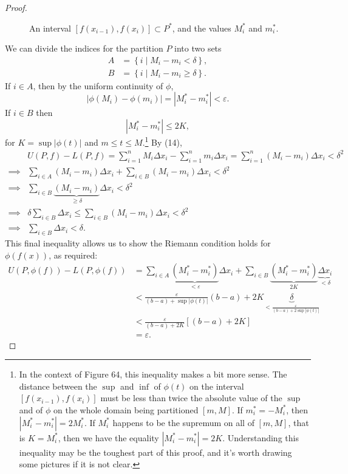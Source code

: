 \documentclass{article}
\theoremstyle{definition}
\begin{document}
\begin{proof}
\begin{figure}[h!]
			\caption{An interval $ [f(x_{i-1}),f(x_{i})]\subset P^* $, and the values $ M_i^* $  and $ m_i^* $.}
		\end{figure}
		We can divide the indices for the partition $ P $ into two sets \begin{align*}
			A&=\left\{i\mid M_i-m_i<\delta \right\},\\
			B&=\left\{i\mid M_i-m_i\ge\delta \right\}.
		\end{align*} 
		If $ i\in A $, then by the uniform continuity of $ \phi $, $$|\phi(M_i)-\phi(m_i)|=|M_i^*-m_i^*|<\varepsilon .$$ If $ i\in B $ then $$|M_i^*-m_i^*|\le 2K ,$$ for $ K=\sup|\phi(t)| $ and $ m\le t\le M $.\footnote{In the context of Figure 64, this inequality makes a bit more sense. The distance between the $ \sup $ and $ \inf $ of $ \phi(t) $ on the interval $ [f(x_{i-1}),f(x_{i})] $ must be less than twice the absolute value of the $ \sup $ and of $ \phi $ on the whole domain being partitioned $ [m,M] $. If $ m_i^*=-M_i^* $, then $ |M_i^*-m_i^*|=2M_i^* $. If $ M_i^* $ happens to be the supremum on all of $ [m,M] $, that is $ K=M_i^* $, then we have the equality $ |M_i^*-m_i^*|=2K $. Understanding this inequality may be the toughest part of this proof, and it's worth drawing some pictures if it is not clear.} 	By (14), \begin{align*}
			&U(P,f)-L(P,f)=\sum_{i=1}^nM_i\Delta x_i-\sum_{i=1}^nm_i\Delta x_i=\sum_{i=1}^n(M_i-m_i)\Delta x_i<\delta^2\\\implies&\sum_{i\in A}(M_i-m_i)\Delta x_i+\sum_{i\in B}(M_i-m_i)\Delta x_i<\delta^2\\\implies&\sum_{i\in B}\underbrace{(M_i-m_i)}_{\ge\delta}\Delta x_i<\delta^2\\\implies& \delta \sum_{i\in B}\Delta x_i\le\sum_{i\in B}(M_i-m_i)\Delta x_i<\delta^2\\\implies& \sum_{i\in B}\Delta x_i<\delta.
		\end{align*}
		This final inequality allows us to show the Riemann condition holds for $ \phi(f(x)) $, as required:
		\begin{align*}
			U(P,\phi(f))-L(P,\phi(f))&=\sum_{i\in A}\underbrace{(M_i^*-m_i^*)}_{<\varepsilon}\Delta x_i+\sum_{i\in B}\underbrace{(M_i^*-m_i^*)}_{2K}\underbrace{\Delta x_i}_{<\delta}\\&<\frac{\varepsilon}{(b-a)+\sup|\phi(t)|}(b-a)+2K\underbrace{\delta}_{<\frac{\varepsilon}{(b-a)+2\sup|\phi(t)|}}\\&<\frac{\varepsilon}{(b-a)+2K}[(b-a)+2K]\\&=\varepsilon.
		\end{align*}
	\end{proof}
\end{document}
